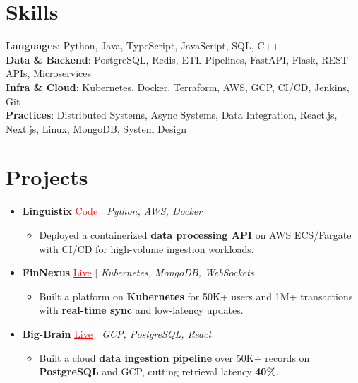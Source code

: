 \documentclass[letterpaper,10pt]{article}
\newcommand{\resumeItem}[1]{\item\small{{#1 \vspace{-2pt}}}}
\newcommand{\resumeProjectHeading}[1]{\item \small #1 \vspace{-2pt}}
\newcommand{\resumeSubHeadingListStart}{\begin{itemize}[leftmargin=0.0in, label={}]}
\newcommand{\resumeSubHeadingListEnd}{\end{itemize}}
\newcommand{\resumeProjItemListStart}{\begin{itemize}[leftmargin=0.15in,label=\textbullet,itemsep=0pt,topsep=0pt,parsep=0pt,partopsep=0pt]}
\newcommand{\resumeProjItemListEnd}{\end{itemize}\vspace{-4pt}}
\begin{document}
\section{Skills}
\begin{itemize}[leftmargin=0.15in, label={}]
\small{\item{
\textbf{Languages}: Python, Java, TypeScript, JavaScript, SQL, C++ \\
\textbf{Data \& Backend}: PostgreSQL, Redis, ETL Pipelines, FastAPI, Flask, REST APIs, Microservices \\
\textbf{Infra \& Cloud}: Kubernetes, Docker, Terraform, AWS, GCP, CI/CD, Jenkins, Git \\
\textbf{Practices}: Distributed Systems, Async Systems, Data Integration, React.js, Next.js, Linux, MongoDB, System Design
}}
\end{itemize}
\vspace{-6pt}
\section{Projects}
\resumeSubHeadingListStart
\vspace{-2pt}
\resumeProjectHeading{\textbf{Linguistix} {\href{https://github.com/SAHAJ-BHADJA/Linguistix}{\textcolor{red}{\underline{Code}}}} $|$ \emph{Python, AWS, Docker}}
\resumeProjItemListStart
\resumeItem{Deployed a containerized \textbf{data processing API} on AWS ECS/Fargate with CI/CD for high-volume ingestion workloads.}
\resumeProjItemListEnd
\vspace{3pt}
\resumeProjectHeading{\textbf{FinNexus} {\href{https://fin-nexus.vercel.app/}{\textcolor{red}{\underline{Live}}}} $|$ \emph{Kubernetes, MongoDB, WebSockets}}
\resumeProjItemListStart
\resumeItem{Built a platform on \textbf{Kubernetes} for 50K+ users and 1M+ transactions with \textbf{real-time sync} and low-latency updates.}
\resumeProjItemListEnd
\vspace{3pt}
\resumeProjectHeading{\textbf{Big-Brain} {\href{https://big-brain-pied.vercel.app/}{\textcolor{red}{\underline{Live}}}} $|$ \emph{GCP, PostgreSQL, React}}
\resumeProjItemListStart
\resumeItem{Built a cloud \textbf{data ingestion pipeline} over 50K+ records on \textbf{PostgreSQL} and GCP, cutting retrieval latency \textbf{40\%}.}
\resumeProjItemListEnd
\resumeSubHeadingListEnd
\end{document}
